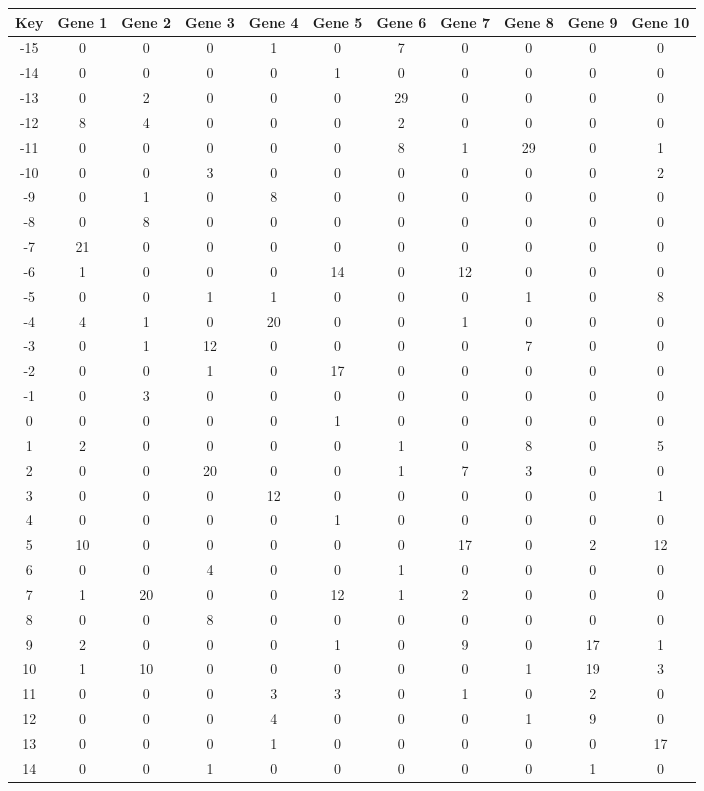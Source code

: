 \begin{tabular}{|c|c|c|c|c|c|c|c|c|c|c|}
\hline
Key & Gene 1 & Gene 2 & Gene 3 & Gene 4 & Gene 5 & Gene 6 & Gene 7 & Gene 8 & Gene 9 & Gene 10 \\
\hline
-15 & 0 & 0 & 0 & 1 & 0 & 7 & 0 & 0 & 0 & 0 \\
-14 & 0 & 0 & 0 & 0 & 1 & 0 & 0 & 0 & 0 & 0 \\
-13 & 0 & 2 & 0 & 0 & 0 & 29 & 0 & 0 & 0 & 0 \\
-12 & 8 & 4 & 0 & 0 & 0 & 2 & 0 & 0 & 0 & 0 \\
-11 & 0 & 0 & 0 & 0 & 0 & 8 & 1 & 29 & 0 & 1 \\
-10 & 0 & 0 & 3 & 0 & 0 & 0 & 0 & 0 & 0 & 2 \\
-9 & 0 & 1 & 0 & 8 & 0 & 0 & 0 & 0 & 0 & 0 \\
-8 & 0 & 8 & 0 & 0 & 0 & 0 & 0 & 0 & 0 & 0 \\
-7 & 21 & 0 & 0 & 0 & 0 & 0 & 0 & 0 & 0 & 0 \\
-6 & 1 & 0 & 0 & 0 & 14 & 0 & 12 & 0 & 0 & 0 \\
-5 & 0 & 0 & 1 & 1 & 0 & 0 & 0 & 1 & 0 & 8 \\
-4 & 4 & 1 & 0 & 20 & 0 & 0 & 1 & 0 & 0 & 0 \\
-3 & 0 & 1 & 12 & 0 & 0 & 0 & 0 & 7 & 0 & 0 \\
-2 & 0 & 0 & 1 & 0 & 17 & 0 & 0 & 0 & 0 & 0 \\
-1 & 0 & 3 & 0 & 0 & 0 & 0 & 0 & 0 & 0 & 0 \\
0 & 0 & 0 & 0 & 0 & 1 & 0 & 0 & 0 & 0 & 0 \\
1 & 2 & 0 & 0 & 0 & 0 & 1 & 0 & 8 & 0 & 5 \\
2 & 0 & 0 & 20 & 0 & 0 & 1 & 7 & 3 & 0 & 0 \\
3 & 0 & 0 & 0 & 12 & 0 & 0 & 0 & 0 & 0 & 1 \\
4 & 0 & 0 & 0 & 0 & 1 & 0 & 0 & 0 & 0 & 0 \\
5 & 10 & 0 & 0 & 0 & 0 & 0 & 17 & 0 & 2 & 12 \\
6 & 0 & 0 & 4 & 0 & 0 & 1 & 0 & 0 & 0 & 0 \\
7 & 1 & 20 & 0 & 0 & 12 & 1 & 2 & 0 & 0 & 0 \\
8 & 0 & 0 & 8 & 0 & 0 & 0 & 0 & 0 & 0 & 0 \\
9 & 2 & 0 & 0 & 0 & 1 & 0 & 9 & 0 & 17 & 1 \\
10 & 1 & 10 & 0 & 0 & 0 & 0 & 0 & 1 & 19 & 3 \\
11 & 0 & 0 & 0 & 3 & 3 & 0 & 1 & 0 & 2 & 0 \\
12 & 0 & 0 & 0 & 4 & 0 & 0 & 0 & 1 & 9 & 0 \\
13 & 0 & 0 & 0 & 1 & 0 & 0 & 0 & 0 & 0 & 17 \\
14 & 0 & 0 & 1 & 0 & 0 & 0 & 0 & 0 & 1 & 0 \\
\hline
\end{tabular}